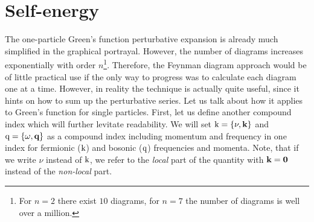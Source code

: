\documentclass[../../main.tex]{subfiles}
\begin{document}
\section{Self-energy}

The one-particle Green's function perturbative expansion is already much simplified in the graphical portrayal. However, the number of diagrams increases exponentially with order $n$\footnote{For $n=2$ there exist $10$ diagrams, for $n=7$ the number of diagrams is well over a million.}. Therefore, the Feynman diagram approach would be of little practical use if the only way to progress was to calculate each diagram one at a time. However, in reality the technique is actually quite useful, since it hints on how to sum up the perturbative series. Let us talk about how it applies to Green's function for single particles. First, let us define another compound index which will further levitate readability. We will set $\text{k}=\{\nu,\textbf{k}\}$ and $\text{q}=\{\omega, \textbf{q}\}$ as a compound index including momentum and frequency in one index for fermionic ($\text{k}$) and bosonic ($\text{q}$) frequencies and momenta. Note, that if we write $\nu$ instead of $\text{k}$, we refer to the \textit{local} part of the quantity with $\textbf{k}=\textbf{0}$ instead of the \textit{non-local} part.
\end{document}
